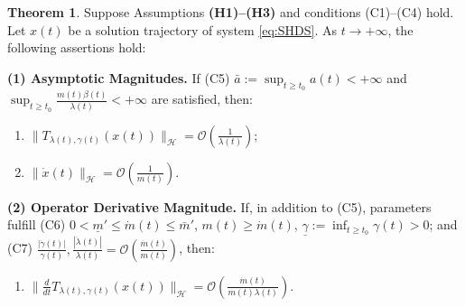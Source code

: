 \documentclass{article}
\theoremstyle{definition}
\newtheorem{theorem}{Theorem}[section]
\theoremstyle{definition}
\theoremstyle{definition}
\begin{document}
\begin{theorem}
\label{thm:pointwise_magnitudes_layered}
Suppose Assumptions {\bf (H1)--(H3)} and conditions {\rm (C1)--(C4)} hold. Let $x(t)$ be a solution trajectory of system \eqref{eq:SHDS}. As $t \to +\infty$, the following assertions hold:

\smallskip
\noindent \textbf{(1) Asymptotic Magnitudes.} If {\rm (C5)} $\bar{a} := \sup_{t \ge t_0} a(t) < +\infty$ and $\sup_{t \geq t_0} \frac{m(t) \beta(t)}{\lambda(t)} < +\infty$ are satisfied, then:
\begin{enumerate}[label=(\roman*), nosep]
    \item $\|T_{\lambda(t), \gamma(t)}(x(t))\|_{\mathcal{H}} = \mathcal{O}( \frac{1}{\lambda(t)})$;
    \item $\|\dot{x}(t)\|_{\mathcal{H}} = \mathcal{O}( \frac{1}{m(t)} )$.
\end{enumerate}

\smallskip
\noindent \textbf{(2) Operator Derivative Magnitude.} If, in addition to {\rm (C5)}, parameters fulfill {\rm (C6)} $0<\underline{m}' \leq \dot{m}(t) \leq \bar{m}'$, $m(t) \geq \dot{m}(t)$, $\underline{\gamma} := \inf_{t \geq t_0} \gamma(t) > 0$; and {\rm (C7)} $\frac{|\dot{\gamma}(t)|}{\gamma(t)}, \frac{|\dot{\lambda}(t)|}{\lambda(t)} = \mathcal{O}( \frac{\dot{m}(t)}{m(t)} )$, then:
\begin{enumerate}[label=(\roman*), resume, nosep]
    \item $\| \frac{d}{dt} T_{\lambda(t), \gamma(t)}(x(t)) \|_{\mathcal{H}} = \mathcal{O}\left( \frac{\dot{m}(t)}{m(t) \lambda(t)} \right)$.
\end{enumerate}


\end{theorem}
\end{document}
